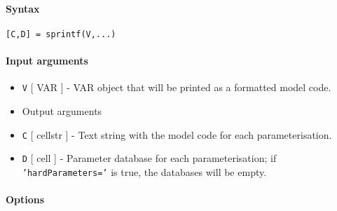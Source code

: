 


	\paragraph{Syntax}

\begin{verbatim}
[C,D] = sprintf(V,...)
\end{verbatim}

\paragraph{Input arguments}

\begin{itemize}
\item
  \texttt{V} {[} VAR {]} - VAR object that will be printed as a
  formatted model code.
\item
  Output arguments
\item
  \texttt{C} {[} cellstr {]} - Text string with the model code for each
  parameterisation.
\item
  \texttt{D} {[} cell {]} - Parameter database for each
  parameterisation; if \texttt{'hardParameters='} is true, the databases
  will be empty.
\end{itemize}

\paragraph{Options}

